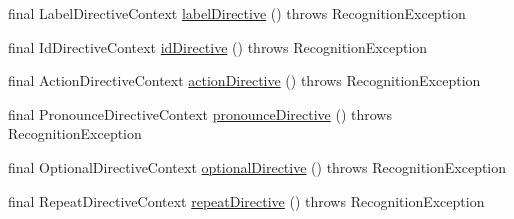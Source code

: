 \begin{DoxyCompactItemize}
\item 
final Label\-Directive\-Context \hyperlink{classit_1_1emarolab_1_1cagg_1_1core_1_1language_1_1parser_1_1ANTLRInterface_1_1ANTLRGenerated_1_1CAGGSyntaxDefinitionParser_a27360a85a9b1ea2bbd9516996ef50c20}{label\-Directive} ()  throws Recognition\-Exception 
\item 
final Id\-Directive\-Context \hyperlink{classit_1_1emarolab_1_1cagg_1_1core_1_1language_1_1parser_1_1ANTLRInterface_1_1ANTLRGenerated_1_1CAGGSyntaxDefinitionParser_a5fcdc94919bf127b961fa1b4b8b3786a}{id\-Directive} ()  throws Recognition\-Exception 
\item 
final Action\-Directive\-Context \hyperlink{classit_1_1emarolab_1_1cagg_1_1core_1_1language_1_1parser_1_1ANTLRInterface_1_1ANTLRGenerated_1_1CAGGSyntaxDefinitionParser_a1769eb60a1c9a9d97ce38fbecea3da87}{action\-Directive} ()  throws Recognition\-Exception 
\item 
final Pronounce\-Directive\-Context \hyperlink{classit_1_1emarolab_1_1cagg_1_1core_1_1language_1_1parser_1_1ANTLRInterface_1_1ANTLRGenerated_1_1CAGGSyntaxDefinitionParser_a79da7d637e584efb332493348b893a55}{pronounce\-Directive} ()  throws Recognition\-Exception 
\item 
final Optional\-Directive\-Context \hyperlink{classit_1_1emarolab_1_1cagg_1_1core_1_1language_1_1parser_1_1ANTLRInterface_1_1ANTLRGenerated_1_1CAGGSyntaxDefinitionParser_aafd2dbd9062e54eb22181c447cef7174}{optional\-Directive} ()  throws Recognition\-Exception 
\item 
final Repeat\-Directive\-Context \hyperlink{classit_1_1emarolab_1_1cagg_1_1core_1_1language_1_1parser_1_1ANTLRInterface_1_1ANTLRGenerated_1_1CAGGSyntaxDefinitionParser_a8fa1c8e609c9bc8940711d2bd14f750c}{repeat\-Directive} ()  throws Recognition\-Exception 
\end{DoxyCompactItemize}
